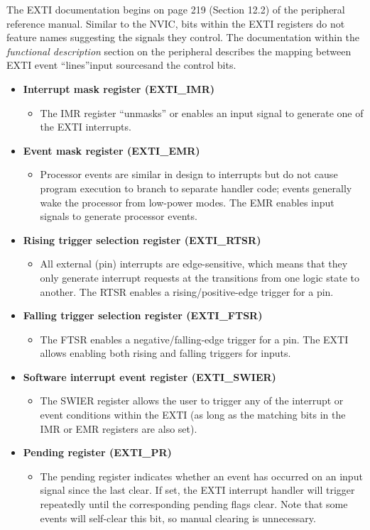 \documentclass[11pt,fleqn]{book} %
\begin{document}
The EXTI documentation begins on page 219 (Section 12.2) of the peripheral reference manual. Similar to the NVIC, bits within the EXTI registers do not feature names suggesting the signals they control. The documentation within the \textit{functional description} section on the peripheral describes the mapping between EXTI event ``lines''\textemdash input sources\textemdash and the control bits. 


\begin{itemize}
    \item \textbf{Interrupt mask register (EXTI\_IMR)}
    \begin{itemize}
        \item The IMR register ``unmasks'' or enables an input signal to generate one of the EXTI interrupts.
    \end{itemize}
    \item \textbf{Event mask register (EXTI\_EMR)}
    \begin{itemize}
        \item Processor events are similar in design to interrupts but do not cause program execution to branch to separate handler code; events generally wake the processor from low-power modes. The EMR enables input signals to generate processor events. 
    \end{itemize}
    \item \textbf{Rising trigger selection register (EXTI\_RTSR)}
    \begin{itemize}
        \item All external (pin) interrupts are edge-sensitive, which means that they only generate interrupt requests at the transitions from one logic state to another. The RTSR enables a rising/positive-edge trigger for a pin.
    \end{itemize}
    \item \textbf{Falling trigger selection register (EXTI\_FTSR)}
    \begin{itemize}
        \item The FTSR enables a negative/falling-edge trigger for a pin. The EXTI allows enabling both rising and falling triggers for inputs.  
    \end{itemize}
    \item \textbf{Software interrupt event register (EXTI\_SWIER)}
    \begin{itemize}
        \item The SWIER register allows the user to trigger any of the interrupt or event conditions within the EXTI (as long as the matching bits in the IMR or EMR registers are also set). 
    \end{itemize}
    \item \textbf{Pending register (EXTI\_PR)}
    \begin{itemize}
        \item  The pending register indicates whether an event has occurred on an input signal since the last clear. If set, the EXTI interrupt handler will trigger repeatedly until the corresponding pending flags clear. Note that some events will self-clear this bit, so manual clearing is unnecessary. 
    \end{itemize}
\end{itemize}
\end{document}
